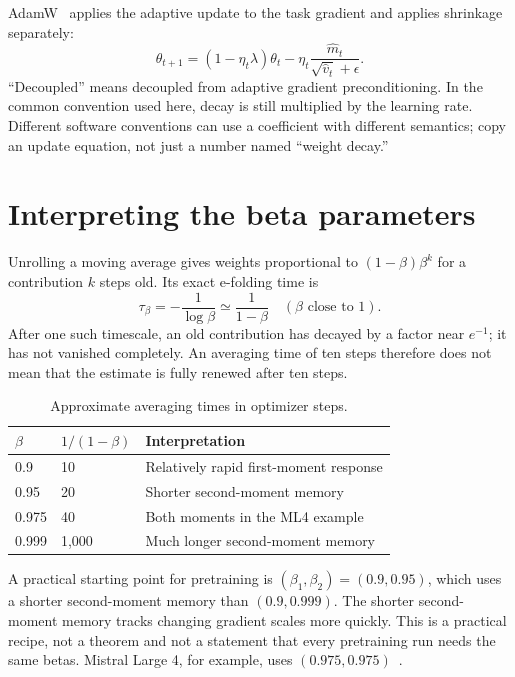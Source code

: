 AdamW~\cite{adamw} applies the adaptive update to the task gradient and applies shrinkage separately:
\begin{equation}\boxed{
 \theta_{t+1}=(1-\eta_t\lambda)\theta_t-
 \eta_t\frac{\widehat m_t}{\sqrt{\widehat v_t}+\epsilon}.}
 \label{eq:adamw}
\end{equation}
``Decoupled'' means decoupled from adaptive gradient preconditioning. In the common convention used here, decay is still multiplied by the learning rate. Different software conventions can use a coefficient with different semantics; copy an update equation, not just a number named ``weight decay.''

\section{Interpreting the beta parameters}
Unrolling a moving average gives weights proportional to $(1-\beta)\beta^k$ for a contribution $k$ steps old. Its exact e-folding time is
\begin{equation}
 \tau_\beta=-\frac{1}{\log\beta}\simeq\frac{1}{1-\beta}
 \quad(\beta\text{ close to }1).
\end{equation}
After one such timescale, an old contribution has decayed by a factor near $e^{-1}$; it has not vanished completely. An averaging time of ten steps therefore does not mean that the estimate is fully renewed after ten steps.

\begin{table}[htbp]\centering
\caption{Approximate averaging times in optimizer steps.}
\begin{tabular}{lll}\toprule
$\beta$ & $1/(1-\beta)$ & Interpretation\\\midrule
0.9 & 10 & Relatively rapid first-moment response\\
0.95 & 20 & Shorter second-moment memory\\
0.975 & 40 & Both moments in the ML4 example\\
0.999 & 1,000 & Much longer second-moment memory\\\bottomrule
\end{tabular}
\end{table}

A practical starting point for pretraining is $(\beta_1,\beta_2)=(0.9,0.95)$, which uses a shorter second-moment memory than $(0.9,0.999)$. The shorter second-moment memory tracks changing gradient scales more quickly. This is a practical recipe, not a theorem and not a statement that every pretraining run needs the same betas. Mistral Large 4, for example, uses $(0.975,0.975)$~\cite{mistral4}.

